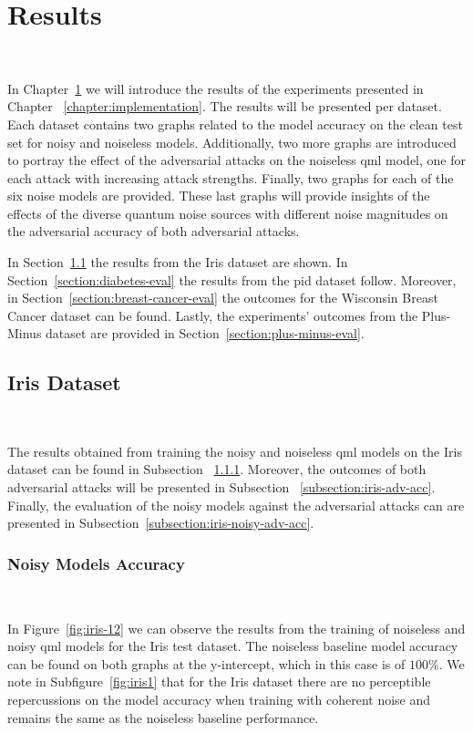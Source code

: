 \chapter{Results}\label{chapter:results} \

In Chapter~\ref{chapter:results} we will introduce
the results of the experiments presented in Chapter
~\ref{chapter:implementation}. The results will be presented
per dataset. Each dataset contains two graphs related to
the model accuracy on the clean test set for noisy and
noiseless models. Additionally, two more graphs are
introduced to portray the effect of the adversarial
attacks on the noiseless \ac{qml} model, one for each
attack with increasing attack strengths. Finally, two
graphs for each of the six noise models are provided.
These last graphs will provide insights of the effects
of the diverse quantum noise sources with different noise 
magnitudes on the adversarial accuracy of both adversarial
attacks. \

In Section~\ref{section:iris-eval} the results from
the Iris dataset are shown. In Section~\ref{section:diabetes-eval}
the results from the \ac{pid} dataset follow. Moreover,
in Section~\ref{section:breast-cancer-eval} the outcomes
for the Wisconsin Breast Cancer dataset can be found.
Lastly, the experiments' outcomes from the Plus-Minus dataset
are provided in Section~\ref{section:plus-minus-eval}. \

\section{Iris Dataset}\label{section:iris-eval} \

The results obtained from training the noisy and noiseless
\ac{qml} models on the Iris dataset can be found in Subsection
~\ref{subsection:iris-noisy-acc}. Moreover, the outcomes
of both adversarial attacks will be presented in Subsection
~\ref{subsection:iris-adv-acc}. Finally, the evaluation
of the noisy models against the adversarial attacks can
are presented in Subsection~\ref{subsection:iris-noisy-adv-acc}. \

\subsection{Noisy Models Accuracy}\label{subsection:iris-noisy-acc} \

In Figure~\ref{fig:iris-12} we can observe the results
from the training of noiseless and noisy \ac{qml} models
for the Iris test dataset. The noiseless baseline model accuracy
can be found on both graphs at the y-intercept, which in
this case is of \(100\%\). We note in Subfigure~\ref{fig:iris1}
that for the Iris dataset there are no perceptible
repercussions on the model accuracy when training with
coherent noise and remains the same as the noiseless
baseline performance. \

